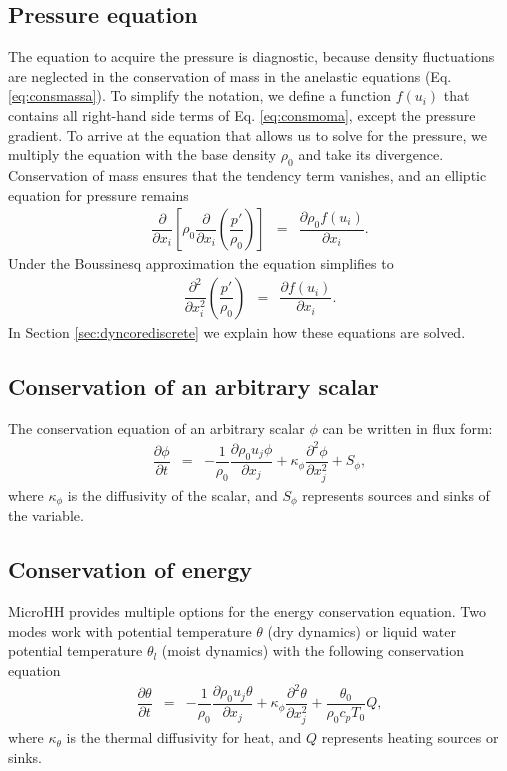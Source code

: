 \documentclass[gmd]{copernicus}
\begin{document}
\subsection{Pressure equation}
The equation to acquire the pressure is diagnostic, because density fluctuations are neglected in the conservation of mass in the anelastic equations (Eq. \ref{eq:consmassa}). To simplify the notation, we define a function $f \left( u_i \right)$ that contains all right-hand side terms of Eq. \ref{eq:consmoma}, except the pressure gradient. To arrive at the equation that allows us to solve for the pressure, we multiply the equation with the base density $\rho_0$ and take its divergence. Conservation of mass ensures that the tendency term vanishes, and an elliptic equation for pressure remains
\begin{eqnarray}
\dfrac{\partial}{\partial x_i} 
\left[ \rho_0 \dfrac{\partial}{\partial x_i} \left( \dfrac{p'}{\rho_0} \right) \right] & = &
\dfrac{\partial \rho_0 f \left( u_i \right)}{\partial x_i}.\label{eq:presa}
\end{eqnarray}
Under the Boussinesq approximation the equation simplifies to
\begin{eqnarray}
\dfrac{\partial^2}{\partial x_i^2} \left( \dfrac{p'}{\rho_0} \right) & = &
\dfrac{\partial f \left( u_i \right)}{\partial x_i}.\label{eq:presb}
\end{eqnarray}
In Section \ref{sec:dyncorediscrete} we explain how these equations are solved.

\subsection{Conservation of an arbitrary scalar}
The conservation equation of an arbitrary scalar $\phi$ can be written in flux form:
\begin{eqnarray}
\dfrac{\partial \phi}{\partial t} & = & - \dfrac{1}{\rho_0} \dfrac{\partial \rho_0 u_j \phi}{\partial x_j} +
\kappa_\phi \dfrac{\partial^2 \phi}{\partial x_j^2} + S_\phi, \label{eq:consscal}
\end{eqnarray}
where $\kappa_\phi$ is the diffusivity of the scalar, and $S_\phi$ represents sources and sinks of the variable.

\subsection{Conservation of energy}
MicroHH provides multiple options for the energy conservation equation. Two modes work with potential temperature $\theta$ (dry dynamics) or liquid water potential temperature $\theta_l$ (moist dynamics) with the following conservation equation
\begin{eqnarray}
\dfrac{\partial \theta}{\partial t} & = & - \dfrac{1}{\rho_0} \dfrac{\partial \rho_0 u_j \theta}{\partial x_j} + \kappa_\phi \dfrac{\partial^2 \theta}{\partial x_j^2} + \dfrac{\theta_0}{\rho_0 c_p T_0} Q,
\end{eqnarray}
where $\kappa_\theta$ is the thermal diffusivity for heat, and $Q$ represents heating sources or sinks.
\end{document}
